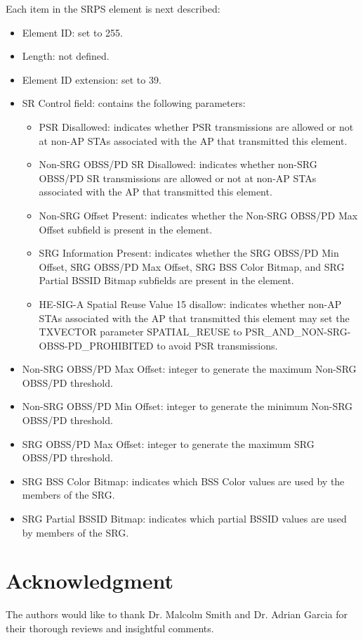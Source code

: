 \documentclass{ieeeaccess}
\begin{document}
Each item in the SRPS element is next described:
\begin{itemize}
	\item Element ID: set to 255.
	\item Length: not defined.
	\item Element ID extension: set to 39.
	\item SR Control field: contains the following parameters:
	\begin{itemize}
		\item PSR Disallowed: indicates whether PSR transmissions are allowed or not at non-AP STAs associated with the AP that transmitted this element.
		\item Non-SRG OBSS/PD SR Disallowed: indicates whether non-SRG OBSS/PD SR transmissions are allowed or not at non-AP STAs associated with the AP that transmitted this element.
		\item Non-SRG Offset Present: indicates whether the Non-SRG OBSS/PD Max Offset subfield is present in the element.
		\item SRG Information Present: indicates whether the SRG OBSS/PD Min Offset, SRG OBSS/PD Max Offset, SRG BSS Color Bitmap, and SRG Partial BSSID Bitmap subfields are present in the element.
		\item HE-SIG-A Spatial Reuse Value 15 disallow: indicates whether non-AP STAs associated with the AP that transmitted this element may set the TXVECTOR parameter SPATIAL\_REUSE to PSR\_AND\_NON-SRG-OBSS-PD\_PROHIBITED to avoid PSR transmissions.
	\end{itemize}
	\item Non-SRG OBSS/PD Max Offset: integer to generate the maximum Non-SRG OBSS/PD threshold.
	\item Non-SRG OBSS/PD Min Offset: integer to generate the minimum Non-SRG OBSS/PD threshold.
	\item SRG OBSS/PD Max Offset: integer to generate the maximum SRG OBSS/PD threshold.
	\item SRG BSS Color Bitmap: indicates which BSS Color values are used by the members of the SRG.
	\item SRG Partial BSSID Bitmap: indicates which partial BSSID values are used by members of the SRG.
\end{itemize}

\section*{Acknowledgment}
The authors would like to thank Dr. Malcolm Smith and Dr. Adrian Garcia for their thorough reviews and insightful comments.
\end{document}
